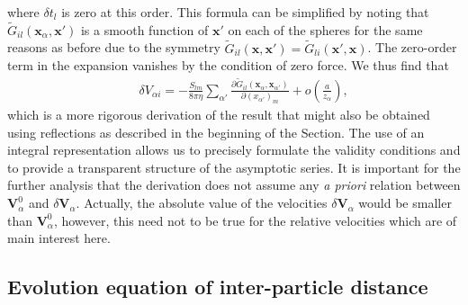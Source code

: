 where $\delta t_{l}$ is zero at this order. This formula can be simplified by noting that ${\tilde G}_{il}(\bm x_{\alpha}, \bm x')$ is a smooth function of $\bm x'$ on each of the spheres for the same reasons as before due to the symmetry ${\tilde G}_{il}(\bm x, \bm x')={\tilde G}_{li}(\bm x', \bm x)$. The zero-order term in the expansion vanishes by the condition of zero force. We thus find that
\begin{eqnarray}&&\!\!\!\!\!\!\!\!\!\!\!\!\!\!\!\!
\delta V_{\alpha i}=-\frac{S_{lm}}{8\pi \eta}\sum_{\alpha'}\frac{\partial {\tilde G}_{il}(\bm x_{\alpha}, \bm x_{\alpha'})}{\partial (x_{\alpha'})_m}+o\left(\frac{a}{z_{\alpha}}\right), \label{response}
\end{eqnarray}
which is a more rigorous derivation of the result that might also be obtained using reflections as described in the beginning of the Section. The use of an integral representation allows us to precisely formulate the validity conditions and to provide a transparent structure of the asymptotic series. It is important for the further analysis that the derivation does not assume any \emph{a priori} relation between $\bm V^0_{\alpha}$ and $\delta \bm V_{\alpha}$. Actually, the absolute value of the velocities $\delta \bm V_{\alpha}$ would be smaller than $\bm V^0_{\alpha}$, however, this need not to be true for the relative velocities which are of main interest here.


\subsection{Evolution equation of inter-particle distance} \label{dista}

